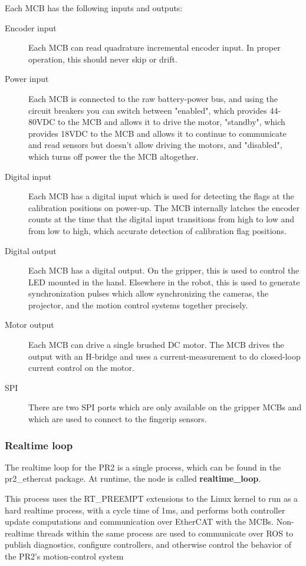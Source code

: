 Each MCB has the following inputs and outputs:
\begin{description}
\item[Encoder input] Each MCB can read quadrature incremental encoder input.  In proper operation, this should never skip or drift.
\item[Power input] Each MCB is connected to the raw battery-power bus, and using the circuit breakers you can switch between "enabled", which provides 44-80VDC
to the MCB and allows it to drive the motor, "standby", which provides 18VDC to the MCB and allows it to continue to communicate and read sensors but
doesn't allow driving the motors, and "disabled", which turns off power the the MCB altogether.
\item[Digital input] Each MCB has a digital input which is used for detecting the flags at the calibration positions on power-up.  The MCB internally latches the encoder counts at the time that the digital input transitions from high to low and from low to high, which accurate detection of calibration flag positions.
\item[Digital output] Each MCB has a digital output.  On the gripper, this is used to control the LED mounted in the hand.
Elsewhere in the robot, this is used to generate synchronization pulses which allow synchronizing the cameras, the projector,
and the motion control systems together precisely.
\item[Motor output] Each MCB can drive a single brushed DC motor.  The MCB drives the output with an H-bridge and uses a current-measurement to do closed-loop current control on the motor.
\item[SPI] There are two SPI ports which are only available on the gripper MCBs and which are used to connect to the fingerip sensors.
\end{description}

\subsubsection{Realtime loop}
The realtime loop for the PR2 is a single process, which can be found in the pr2\_ethercat package.  At runtime, the node is called {\bf realtime\_loop}.

This process uses the RT\_PREEMPT extensions to the Linux kernel to run as a hard realtime process, with a cycle time of 1ms, and performs both controller update computations and communication over EtherCAT with the MCBs.  Non-realtime threads within the same process are used to communicate over ROS to publish diagnostics, configure controllers, and otherwise control the behavior of the PR2's motion-control system

